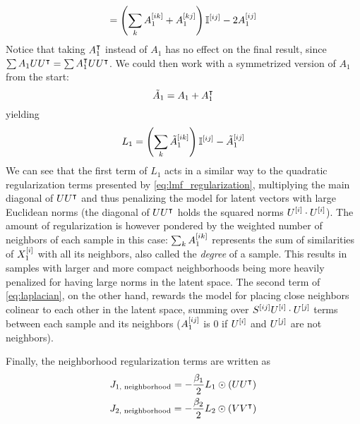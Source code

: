 \begin{apendicesenv}
\begin{equation}
    = \left(\sum_k A_1^{[ik]} + A_1^{[kj]}\right)
        \mathbb{I}^{[ij]}
        - 2 A_1^{[ij]} 
    \label{eq:laplacian}
\end{equation}
%
Notice that taking $A_1^\intercal$ instead of $A_1$ has no effect on the final result, since $\sum A_1 UU^\intercal = \sum A_1^\intercal UU^\intercal$. We could then work with a symmetrized version of $A_1$ from the start:
%
\begin{equation*}
    \tilde A_1 = A_1 + A_1^\intercal
\end{equation*}
yielding
%
\begin{equation*}
    L_1 = \left(\sum_k \tilde A_1^{[ik]}\right)
        \mathbb{I}^{[ij]}
        - \tilde A_1^{[ij]} 
\end{equation*}
%
We can see that the first term of $L_1$ acts in a similar way to the quadratic regularization terms presented by \autoref{eq:lmf_regularization}, multiplying the main diagonal of $UU^\intercal$ and thus penalizing the model for latent vectors with large Euclidean norms (the diagonal of $UU^\intercal$ holds the squared norms $U^{[i]}\cdot U^{[i]}$). The amount of regularization is however pondered by the weighted number of neighbors of each sample in this case: $\sum_k A_1^{[ik]}$ represents the sum of similarities of $X_1^{[i]}$ with all its neighbors, also called the \emph{degree} of a sample. This results in samples with larger and more compact neighborhoods being more heavily penalized for having large norms in the latent space. The second term of \autoref{eq:laplacian}, on the other hand, rewards the model for placing close neighbors colinear to each other in the latent space, summing over $S^{[ij]} U^{[i]}\cdot U^{[j]}$ terms
between each sample and its neighbors ($A_1^{[ij]}$ is $0$ if $U^{[i]}$ and $U^{[j]}$ are not neighbors).

Finally, the neighborhood regularization terms are written as
%
\begin{gather}
    J_\text{1, neighborhood} = -\frac{\beta_1}{2} L_1 \odot (UU^\intercal)\\
    J_\text{2, neighborhood} = -\frac{\beta_2}{2} L_2 \odot (VV^\intercal)
\end{gather}
%
%


\end{apendicesenv}
